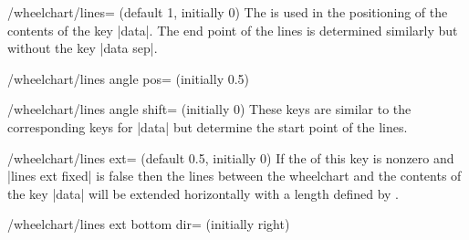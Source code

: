 \documentclass[a4paper,english,dvipsnames]{ltxdoc}
\begin{document}
\begin{key}{/wheelchart/lines= (default 1, initially 0)}
The  is used in the positioning of the contents of the key |data|. The end point of the lines is determined similarly but without the key |data sep|.
\begin{codeexample}[width=10cm,preamble={\usepackage{siunitx}}]
\end{codeexample}
\end{key}
\begin{key}{/wheelchart/lines angle pos= (initially 0.5)}
\end{key}
\begin{key}{/wheelchart/lines angle shift= (initially 0)}
These keys are similar to the corresponding keys for |data| but determine the start point of the lines.
\end{key}
\begin{key}{/wheelchart/lines ext= (default 0.5, initially 0)}
If the  of this key is nonzero and |lines ext fixed| is false then the lines between the wheelchart and the contents of the key |data| will be extended horizontally with a length defined by .
\end{key}
\begin{key}{/wheelchart/lines ext bottom dir= (initially right)}
\end{key}
\end{document}
